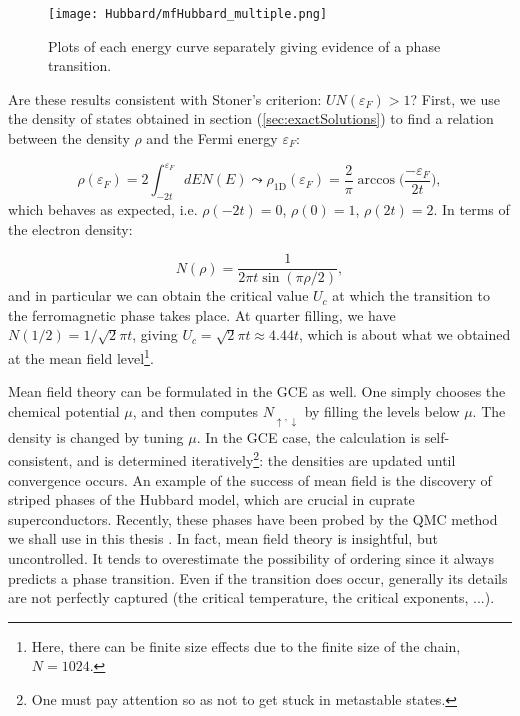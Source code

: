 \begin{figure}[H]
	\centering
\texttt{[image: Hubbard/mfHubbard\_multiple.png]}
	\caption[Mean field results for the \acs{1D} Hubbard model: closing in on the phase transition.]{Plots of each energy curve separately giving evidence of a phase transition.
	}
	\label{fig:mft_multiple}
\end{figure}

Are these results consistent with Stoner's criterion: $U N ( \varepsilon_F ) > 1$?
First, we use the density of states obtained in section (\ref{sec:exactSolutions}) to find a relation between the density $\rho$ and the Fermi energy $\varepsilon_F$:

\begin{equation}
\rho ( \varepsilon_F ) = 2 \int_{-2t}^{\varepsilon_F} dE N ( E ) \leadsto \rho_{\text{1D}} ( \varepsilon_F ) = \frac{2}{\pi} \arccos\bigg( \frac{-\varepsilon_F}{2t}\bigg) ,
\end{equation}
which behaves as expected, i.e. $\rho ( -2 t ) = 0$,  $\rho ( 0 ) = 1$, $\rho ( 2 t ) = 2$.
In terms of the electron density:

\begin{equation}
N ( \rho ) = \frac{1}{2\pi t \sin(\pi \rho / 2)} ,
\end{equation}
and in particular we can obtain the critical value $U_c$ at which the transition to the ferromagnetic phase takes place.
At quarter filling, we have $N( 1 / 2 ) = 1 /\sqrt{2} \pi t$, giving $U_c = \sqrt{2} \pi t \approx 4.44 t$, which is about what we obtained at the mean field level\footnote{Here, there can be finite size effects due to the finite size of the chain, $N = 1024$.}.

Mean field theory can be formulated in the \ac{GCE} as well.
One simply chooses the chemical potential $\mu$, and then computes $N_{\uparrow, \downarrow}$ by filling the levels below $\mu$.
The density is changed by tuning $\mu$.
In the \ac{GCE} case, the calculation is self-consistent, and is determined iteratively\footnote{One must pay attention so as not to get stuck in metastable states.}: the densities are updated until convergence occurs.
An example of the success of mean field is the discovery of striped phases of the Hubbard model, which are crucial in cuprate superconductors.
Recently, these phases have been probed by the \ac{QMC} method we shall use in this thesis \cite{huang_stripe_2018}.
In fact, mean field theory is insightful, but uncontrolled.
It tends to overestimate the possibility of ordering since it always predicts a phase transition.
Even if the transition does occur, generally its details are not perfectly captured (the critical temperature, the critical exponents, ...).

